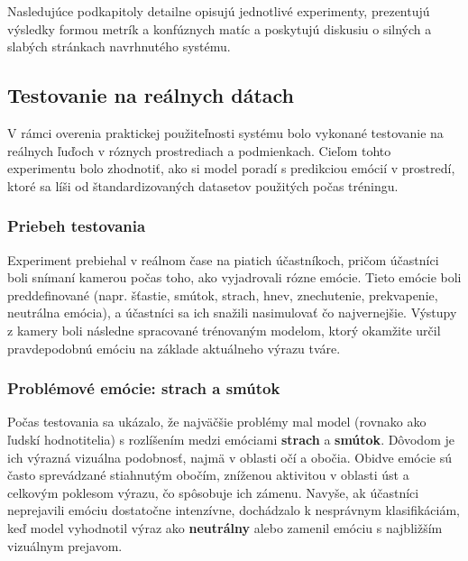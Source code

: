 Nasledujúce podkapitoly detailne opisujú jednotlivé experimenty, prezentujú výsledky formou metrík a konfúznych matíc a poskytujú diskusiu o silných a slabých stránkach navrhnutého systému.
\subsection{Testovanie na re\'alnych d\'atach}

V r\'amci overenia praktickej pou\v{z}ite\v{l}nosti syst\'emu bolo vykonan\'e testovanie na re\'alnych \v{l}u\v{d}och v r\'oznych prostrediach a podmienkach. Cie\v{l}om tohto experimentu bolo zhodnoti\v{t}, ako si model porad\'i s predikciou em\'oci\'i v prostred\'i, ktor\'e sa l\'i\v{s}i od \v{s}tandardizovan\'ych datasetov pou\v{z}it\'ych po\v{c}as tr\'eningu.

\subsubsection{Priebeh testovania}
Experiment prebiehal v re\'alnom \v{c}ase na piatich \'u\v{c}astn\'ikoch, pri\v{c}om \'u\v{c}astn\'ici boli sn\'iman\'i kamerou po\v{c}as toho, ako vyjadrovali r\'ozne em\'ocie. Tieto em\'ocie boli preddefinovan\'e (napr. \v{s}\v{t}astie, sm\'utok, strach, hnev, znechutenie, prekvapenie, neutr\'alna em\'ocia), a \'u\v{c}astn\'ici sa ich sna\v{z}ili nasimulova\v{t} \v{c}o najvernej\v{s}ie. V\'ystupy z kamery boli n\'asledne spracovan\'e tr\'enovan\'ym modelom, ktor\'y okam\v{z}ite ur\v{c}il pravdepodobn\'u em\'ociu na z\'aklade aktu\'alneho v\'yrazu tv\'are.

\subsubsection{Probl\'emov\'e em\'ocie: strach a sm\'utok}
Po\v{c}as testovania sa uk\'azalo, \v{z}e najv\"a\v{c}\v{s}ie probl\'emy mal model (rovnako ako \v{l}udsk\'i hodnotitelia) s rozl\'i\v{s}en\'im medzi em\'ociami \textbf{strach} a \textbf{sm\'utok}. D\^ovodom je ich v\'yrazn\'a vizu\'alna podobnos\v{t}, najm\"a v oblasti o\v{c}\'i a obo\v{c}ia. Obidve em\'ocie s\'u \v{c}asto sprev\'adzan\'e stiahnut\'ym obo\v{c}\'im, zn\'i\v{z}enou aktivitou v oblasti \'ust a celkov\'ym poklesom v\'yrazu, \v{c}o sp\^osobuje ich z\'amenu. Navy\v{s}e, ak \'u\v{c}astn\'ici neprejavili em\'ociu dostato\v{c}ne intenz\'ivne, doch\'adzalo k nespr\'avnym klasifik\'aci\'am, ke\v{d} model vyhodnotil v\'yraz ako \textbf{neutr\'alny} alebo zamenil em\'ociu s najbli\v{z}\v{s}\'im vizu\'alnym prejavom.


